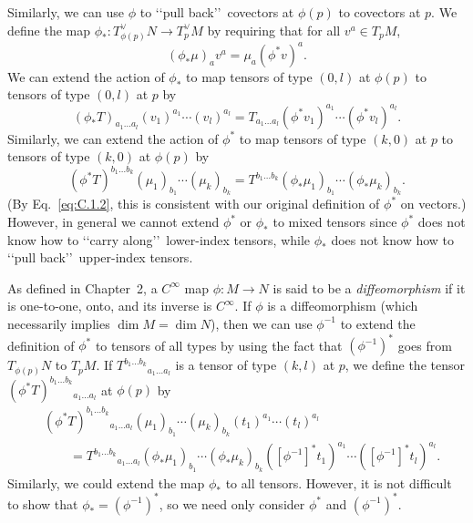 Similarly, we can use \(\phi\) to \lq\lq pull back\rq\rq\ covectors at \(\phi(p)\) to
covectors at \(p\). We define the map \(\phi_*:T_{\phi(p)}^\vee N\to T_p^\vee M\) by
requiring that for all \(v^a\in T_pM\),
\begin{equation}
  (\phi_*\mu)_a v^a=\mu_a(\phi^*v)^a.
  \tag{C.1.2}\label{eq:C.1.2}
\end{equation}
We can extend the action of \(\phi_*\) to map tensors of type \((0,l)\) at
\(\phi(p)\) to tensors of type \((0,l)\) at \(p\) by
\begin{equation}
  (\phi_*T)_{a_1\ldots a_l}(v_1)^{a_1}\cdots(v_l)^{a_l}
  =T_{a_1\ldots a_l}(\phi^*v_1)^{a_1}\cdots(\phi^*v_l)^{a_l}.
  \tag{C.1.3}\label{eq:C.1.3}
\end{equation}
Similarly, we can extend the action of \(\phi^*\) to map tensors of type \((k,0)\)
at \(p\) to tensors of type \((k,0)\) at \(\phi(p)\) by
\begin{equation}
  (\phi^*T)^{b_1\ldots b_k}(\mu_1)_{b_1}\cdots(\mu_k)_{b_k}
  =T^{b_1\ldots b_k}(\phi_*\mu_1)_{b_1}\cdots(\phi_*\mu_k)_{b_k}.
  \tag{C.1.4}\label{eq:C.1.4}
\end{equation}
(By Eq.~\eqref{eq:C.1.2}, this is consistent with our original definition of
\(\phi^*\) on vectors.) However, in general we cannot extend \(\phi^*\) or
\(\phi_*\) to mixed tensors since \(\phi^*\) does not know how to \lq\lq carry
along\rq\rq\ lower-index tensors, while \(\phi_*\) does not know how to
\lq\lq pull back\rq\rq\ upper-index tensors.

As defined in Chapter~2, a \(C^\infty\) map \(\phi:M\to N\) is said to be a
\emph{diffeomorphism} if it is one-to-one, onto, and its inverse is \(C^\infty\). If
\(\phi\) is a diffeomorphism (which necessarily implies \(\dim M=\dim N\)), then we
can use \(\phi^{-1}\) to extend the definition of \(\phi^*\) to tensors of all types
by using the fact that \((\phi^{-1})^*\) goes from \(T_{\phi(p)}N\) to \(T_pM\). If
\(T^{b_1\ldots b_k}{}_{a_1\ldots a_l}\) is a tensor of type \((k,l)\) at \(p\), we
define the tensor
\((\phi^*T)^{b_1\ldots b_k}{}_{a_1\ldots a_l}\) at \(\phi(p)\) by
\begin{equation}
\begin{aligned}
  &(\phi^*T)^{b_1\ldots b_k}{}_{a_1\ldots a_l}
  (\mu_1)_{b_1}\cdots(\mu_k)_{b_k}
  (t_1)^{a_1}\cdots(t_l)^{a_l} \\
  &\qquad =
  T^{b_1\ldots b_k}{}_{a_1\ldots a_l}
  (\phi_*\mu_1)_{b_1}\cdots(\phi_*\mu_k)_{b_k}
  ([\phi^{-1}]^*t_1)^{a_1}\cdots([\phi^{-1}]^*t_l)^{a_l}.
\end{aligned}
  \tag{C.1.5}\label{eq:C.1.5}
\end{equation}
Similarly, we could extend the map \(\phi_*\) to all tensors. However, it is not
difficult to show that \(\phi_*=(\phi^{-1})^*\), so we need only consider
\(\phi^*\) and \((\phi^{-1})^*\).

